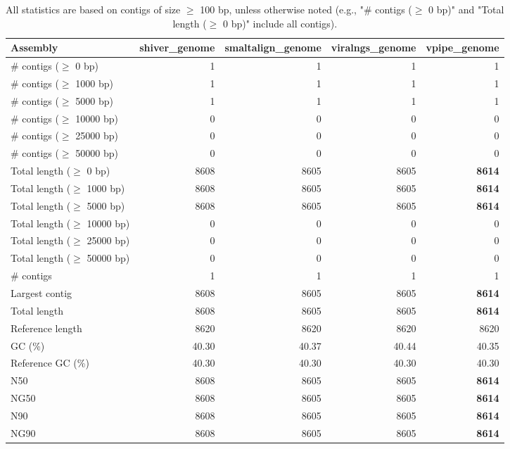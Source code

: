 \documentclass[12pt,a4paper]{article}
\begin{document}
\begin{table}[ht]
\begin{center}
\caption{All statistics are based on contigs of size $\geq$ 100 bp, unless otherwise noted (e.g., "\# contigs ($\geq$ 0 bp)" and "Total length ($\geq$ 0 bp)" include all contigs).}
\begin{tabular}{|l*{4}{|r}|}
\hline
Assembly & shiver\_genome & smaltalign\_genome & viralngs\_genome & vpipe\_genome \\ \hline
\# contigs ($\geq$ 0 bp) & 1 & 1 & 1 & 1 \\ \hline
\# contigs ($\geq$ 1000 bp) & 1 & 1 & 1 & 1 \\ \hline
\# contigs ($\geq$ 5000 bp) & 1 & 1 & 1 & 1 \\ \hline
\# contigs ($\geq$ 10000 bp) & 0 & 0 & 0 & 0 \\ \hline
\# contigs ($\geq$ 25000 bp) & 0 & 0 & 0 & 0 \\ \hline
\# contigs ($\geq$ 50000 bp) & 0 & 0 & 0 & 0 \\ \hline
Total length ($\geq$ 0 bp) & 8608 & 8605 & 8605 & {\bf 8614} \\ \hline
Total length ($\geq$ 1000 bp) & 8608 & 8605 & 8605 & {\bf 8614} \\ \hline
Total length ($\geq$ 5000 bp) & 8608 & 8605 & 8605 & {\bf 8614} \\ \hline
Total length ($\geq$ 10000 bp) & 0 & 0 & 0 & 0 \\ \hline
Total length ($\geq$ 25000 bp) & 0 & 0 & 0 & 0 \\ \hline
Total length ($\geq$ 50000 bp) & 0 & 0 & 0 & 0 \\ \hline
\# contigs & 1 & 1 & 1 & 1 \\ \hline
Largest contig & 8608 & 8605 & 8605 & {\bf 8614} \\ \hline
Total length & 8608 & 8605 & 8605 & {\bf 8614} \\ \hline
Reference length & 8620 & 8620 & 8620 & 8620 \\ \hline
GC (\%) & 40.30 & 40.37 & 40.44 & 40.35 \\ \hline
Reference GC (\%) & 40.30 & 40.30 & 40.30 & 40.30 \\ \hline
N50 & 8608 & 8605 & 8605 & {\bf 8614} \\ \hline
NG50 & 8608 & 8605 & 8605 & {\bf 8614} \\ \hline
N90 & 8608 & 8605 & 8605 & {\bf 8614} \\ \hline
NG90 & 8608 & 8605 & 8605 & {\bf 8614} \\ \hline

\end{tabular}
\end{center}
\end{table}
\end{document}
